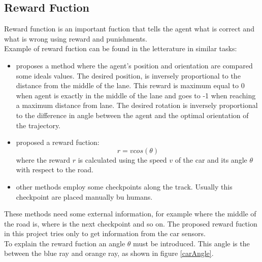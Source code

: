 \documentclass[14pt]{extarticle}
\def\sp{\vspace{5pt}}
\def\pp{\vspace{10pt}\newline}
\begin{document}
\begin{flushleft}
	\subsection{Reward Fuction} \label{rewardfuc}
	\sp
	Reward function is an important fuction that tells the agent what is correct and what is wrong using reward and punishments. \\
	Example of reward fuction can be found in the letterature in similar tasks:
	\begin{itemize}
	\item \cite{Paper1} proposes a method where the agent's position and orientation are compared some ideals values. The desired position, is inversely proportional to the distance from the middle of the lane. This reward is maximum equal to 0 when agent is exactly in the middle of the lane and goes to -1 when reaching a maximum distance from lane. The desired rotation is inversely proportional to the difference in angle between the agent and the optimal orientation of the trajectory.
	\item \cite{Paper2} proposed a reward fuction:
	\[
	 r = v cos(\theta)
	\]
	where the reward $r$ is calculated using the speed $v$ of the car and its angle $\theta$ with respect to the road.
	\item other methods employ some checkpoints along the track. Usually this checkpoint are placed manually bu humans.
	\end{itemize}
	These methods need some external information, for example where the middle of the road is, where is the next checkpoint and so on.
	\pp 
	The proposed reward fuction in this project tries only to get information from the car sensors. \\
To explain the reward fuction an angle $\theta$ must be introduced. This angle is the between the blue ray and orange ray, as shown in figure \ref{carAngle}.


\end{flushleft}
\end{document}
